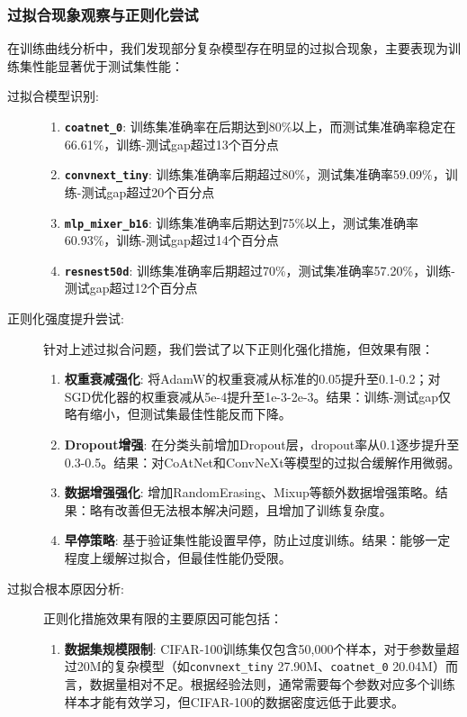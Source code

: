 \documentclass[a4paper]{article}
\begin{document}
\subsubsection{过拟合现象观察与正则化尝试}
在训练曲线分析中，我们发现部分复杂模型存在明显的过拟合现象，主要表现为训练集性能显著优于测试集性能：
\begin{description}
    \item[过拟合模型识别:]
    \begin{enumerate}
        \item \textbf{\texttt{coatnet\_0}}: 训练集准确率在后期达到80\%以上，而测试集准确率稳定在66.61\%，训练-测试gap超过13个百分点
        \item \textbf{\texttt{convnext\_tiny}}: 训练集准确率后期超过80\%，测试集准确率59.09\%，训练-测试gap超过20个百分点
        \item \textbf{\texttt{mlp\_mixer\_b16}}: 训练集准确率后期达到75\%以上，测试集准确率60.93\%，训练-测试gap超过14个百分点
        \item \textbf{\texttt{resnest50d}}: 训练集准确率后期超过70\%，测试集准确率57.20\%，训练-测试gap超过12个百分点
    \end{enumerate}
    \item[正则化强度提升尝试:] 针对上述过拟合问题，我们尝试了以下正则化强化措施，但效果有限：
    \begin{enumerate}
        \item \textbf{权重衰减强化}: 将AdamW的权重衰减从标准的0.05提升至0.1-0.2；对SGD优化器的权重衰减从5e-4提升至1e-3-2e-3。结果：训练-测试gap仅略有缩小，但测试集最佳性能反而下降。
        \item \textbf{Dropout增强}: 在分类头前增加Dropout层，dropout率从0.1逐步提升至0.3-0.5。结果：对CoAtNet和ConvNeXt等模型的过拟合缓解作用微弱。
        \item \textbf{数据增强强化}: 增加RandomErasing、Mixup等额外数据增强策略。结果：略有改善但无法根本解决问题，且增加了训练复杂度。
        \item \textbf{早停策略}: 基于验证集性能设置早停，防止过度训练。结果：能够一定程度上缓解过拟合，但最佳性能仍受限。
    \end{enumerate}
    \item[过拟合根本原因分析:] 正则化措施效果有限的主要原因可能包括：
    \begin{enumerate}
        \item \textbf{数据集规模限制}: CIFAR-100训练集仅包含50,000个样本，对于参数量超过20M的复杂模型（如\texttt{convnext\_tiny} 27.90M、\texttt{coatnet\_0} 20.04M）而言，数据量相对不足。根据经验法则，通常需要每个参数对应多个训练样本才能有效学习，但CIFAR-100的数据密度远低于此要求。

\end{enumerate}
\end{description}
\end{document}
